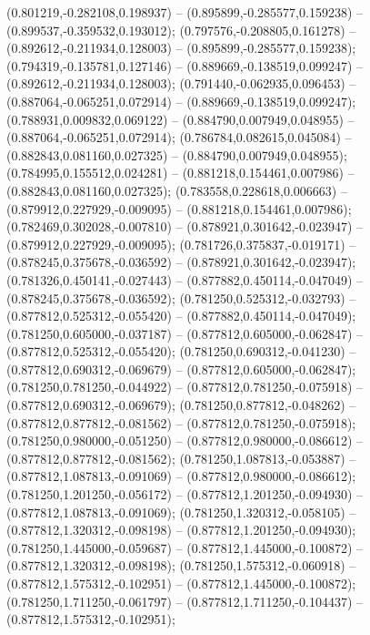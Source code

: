  (0.801219,-0.282108,0.198937) -- (0.895899,-0.285577,0.159238) -- (0.899537,-0.359532,0.193012);
 (0.797576,-0.208805,0.161278) -- (0.892612,-0.211934,0.128003) -- (0.895899,-0.285577,0.159238);
 (0.794319,-0.135781,0.127146) -- (0.889669,-0.138519,0.099247) -- (0.892612,-0.211934,0.128003);
 (0.791440,-0.062935,0.096453) -- (0.887064,-0.065251,0.072914) -- (0.889669,-0.138519,0.099247);
 (0.788931,0.009832,0.069122) -- (0.884790,0.007949,0.048955) -- (0.887064,-0.065251,0.072914);
 (0.786784,0.082615,0.045084) -- (0.882843,0.081160,0.027325) -- (0.884790,0.007949,0.048955);
 (0.784995,0.155512,0.024281) -- (0.881218,0.154461,0.007986) -- (0.882843,0.081160,0.027325);
 (0.783558,0.228618,0.006663) -- (0.879912,0.227929,-0.009095) -- (0.881218,0.154461,0.007986);
 (0.782469,0.302028,-0.007810) -- (0.878921,0.301642,-0.023947) -- (0.879912,0.227929,-0.009095);
 (0.781726,0.375837,-0.019171) -- (0.878245,0.375678,-0.036592) -- (0.878921,0.301642,-0.023947);
 (0.781326,0.450141,-0.027443) -- (0.877882,0.450114,-0.047049) -- (0.878245,0.375678,-0.036592);
 (0.781250,0.525312,-0.032793) -- (0.877812,0.525312,-0.055420) -- (0.877882,0.450114,-0.047049);
 (0.781250,0.605000,-0.037187) -- (0.877812,0.605000,-0.062847) -- (0.877812,0.525312,-0.055420);
 (0.781250,0.690312,-0.041230) -- (0.877812,0.690312,-0.069679) -- (0.877812,0.605000,-0.062847);
 (0.781250,0.781250,-0.044922) -- (0.877812,0.781250,-0.075918) -- (0.877812,0.690312,-0.069679);
 (0.781250,0.877812,-0.048262) -- (0.877812,0.877812,-0.081562) -- (0.877812,0.781250,-0.075918);
 (0.781250,0.980000,-0.051250) -- (0.877812,0.980000,-0.086612) -- (0.877812,0.877812,-0.081562);
 (0.781250,1.087813,-0.053887) -- (0.877812,1.087813,-0.091069) -- (0.877812,0.980000,-0.086612);
 (0.781250,1.201250,-0.056172) -- (0.877812,1.201250,-0.094930) -- (0.877812,1.087813,-0.091069);
 (0.781250,1.320312,-0.058105) -- (0.877812,1.320312,-0.098198) -- (0.877812,1.201250,-0.094930);
 (0.781250,1.445000,-0.059687) -- (0.877812,1.445000,-0.100872) -- (0.877812,1.320312,-0.098198);
 (0.781250,1.575312,-0.060918) -- (0.877812,1.575312,-0.102951) -- (0.877812,1.445000,-0.100872);
 (0.781250,1.711250,-0.061797) -- (0.877812,1.711250,-0.104437) -- (0.877812,1.575312,-0.102951);
